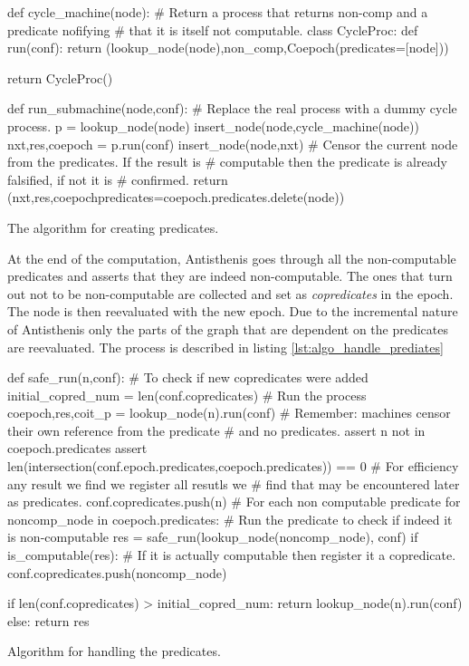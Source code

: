 \begin{code}
\begin{pycode}
def cycle_machine(node):
    # Return a process that returns non-comp and a predicate nofifying
    # that it is itself not computable.
    class CycleProc:
        def run(conf):
           return (lookup_node(node),non_comp,Coepoch(predicates=[node]))

    return CycleProc()

def run_submachine(node,conf):
    # Replace the real process with a dummy cycle process.
    p = lookup_node(node)
    insert_node(node,cycle_machine(node))
    nxt,res,coepoch = p.run(conf)
    insert_node(node,nxt)
    # Censor the current node from the predicates. If the result is
    # computable then the predicate is already falsified, if not it is
    # confirmed.
    return (nxt,res,coepoch{predicates=coepoch.predicates.delete(node)})
\end{pycode}
  \caption{\label{lst:algo_create_predicates}The algorithm for
    creating predicates.}
\end{code}

At the end of the computation, Antisthenis goes through all the
non-computable predicates and asserts that they are indeed
non-computable. The ones that turn out not to be non-computable are
collected and set as \emph{copredicates} in the epoch. The node is
then reevaluated with the new epoch. Due to the incremental nature of
Antisthenis only the parts of the graph that are dependent on the
predicates are reevaluated. The process is described in listing
\ref{lst:algo_handle_prediates}

\begin{code}
\begin{pycode}
def safe_run(n,conf):
    # To check if new copredicates were added
    initial_copred_num = len(conf.copredicates)
    # Run the process
    coepoch,res,coit_p = lookup_node(n).run(conf)
    # Remember: machines censor their own reference from the predicate
    # and no predicates.
    assert n not in coepoch.predicates
    assert len(intersection(conf.epoch.predicates,coepoch.predicates)) == 0
    # For efficiency any result we find we register all resutls we
    # find that may be encountered later as predicates.
    conf.copredicates.push(n)
    # For each non computable predicate
    for noncomp_node in coepoch.predicates:
        # Run the predicate to check if indeed it is non-computable
        res = safe_run(lookup_node(noncomp_node), conf)
        if is_computable(res):
            # If it is actually computable then register it a copredicate.
            conf.copredicates.push(noncomp_node)

    if len(conf.copredicates) > initial_copred_num:
        return lookup_node(n).run(conf)
    else:
        return res
\end{pycode}
  \caption{\label{lst:algo_handle_prediates}Algorithm for handling the
    predicates.}
\end{code}

